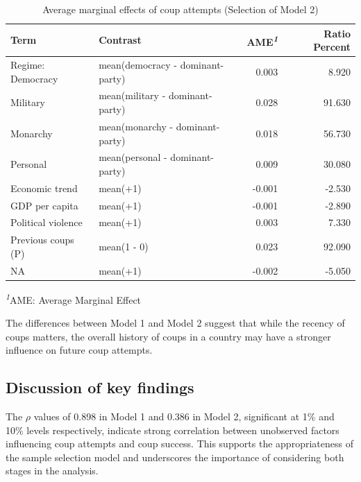 \documentclass[
  12pt,
]{report}
\begin{document}
\begin{longtable}{@{\extracolsep{\fill}}llrr}

\caption{\label{tbl-mfx2}Average marginal effects of coup attempts
(Selection of Model 2)}

\tabularnewline

\toprule
Term & Contrast & AME\textsuperscript{\textit{1}} & Ratio Percent \\ 
\midrule\addlinespace[2.5pt]
Regime: Democracy & mean(democracy - dominant-party) & 0.003 & 8.920 \\ 
{\hspace{47.25pt}Military} & mean(military - dominant-party) & 0.028 & 91.630 \\ 
{\hspace{47.25pt}Monarchy} & mean(monarchy - dominant-party) & 0.018 & 56.730 \\ 
{\hspace{47.25pt}Personal} & mean(personal - dominant-party) & 0.009 & 30.080 \\ 
Economic trend & mean(+1) & -0.001 & -2.530 \\ 
GDP per capita & mean(+1) & -0.001 & -2.890 \\ 
Political violence & mean(+1) & 0.003 & 7.330 \\ 
Previous coups (P) & mean(1 - 0) & 0.023 & 92.090 \\ 
NA & mean(+1) & -0.002 & -5.050 \\ 
\bottomrule

\end{longtable}

\begin{minipage}{\linewidth}
\textsuperscript{\textit{1}}AME: Average Marginal Effect\\
\end{minipage}
\endgroup

The differences between Model 1 and Model 2 suggest that while the
recency of coups matters, the overall history of coups in a country may
have a stronger influence on future coup attempts.

\subsection{Discussion of key
findings}\label{discussion-of-key-findings}

The \(\rho\) values of 0.898 in Model 1 and 0.386 in Model 2,
significant at 1\% and 10\% levels respectively, indicate strong
correlation between unobserved factors influencing coup attempts and
coup success. This supports the appropriateness of the sample selection
model and underscores the importance of considering both stages in the
analysis.
\end{document}
